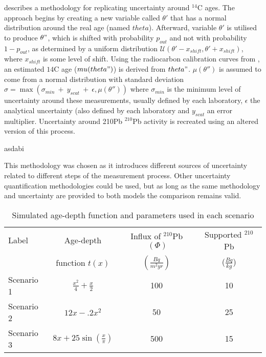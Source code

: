 \documentclass [10pt] {article}
\begin{document}
\citet{Blaauw2018} describes a methodology for replicating uncertainty around $^{14}$C ages. 
The approach begins by creating a new variable called $\theta'$ that has a normal distribution around the real age (named $theta$).
Afterward, variable $\theta'$ is utilised to produce $\theta"$, which is shifted with probability $p_{out}$ and not with probability $1-p_{out}$, as determined by a uniform distribution $\mathcal{U}(\theta' - x_{shift},\theta'+x_{shift})$, where $x_{shift}$ is some level of shift.
Using the radiocarbon calibration curves from \citep{Reimer2013}, an estimated $14$C age ($mu(theta")$) is derived from $theta"$.
$\mu(\theta'')$ is assumed to come from a normal distribution with standard deviation $\sigma =\max( \sigma_{min}~+~y_{scat}~+~\epsilon,\mu(\theta'') )$ where $\sigma_{min}$ is the minimum level of uncertainty around these measurements, usually defined by each laboratory, $\epsilon$ the analytical uncertainty (also defined by each laboratory and $y_{scat}$ an error multiplier. 
Uncertainty around 210Pb $^{210}$Pb  activity is recreated using an altered version of this process.

asdabi

This methodology was chosen as it introduces different sources of uncertainty related to different steps of the measurement process.
Other uncertainty quantification methodologies could be used, but as long as the same methodology and uncertainty are provided to both models the comparison remains valid.

\begin{table}[!h]
	\centering
	\begin{tabular}{l|ccc}
	     Label   & 	Age-depth			&	Influx of $^{210}$Pb$~(\Phi)$	& Supported $^{210}$Pb  \\
			&	function $t(x)$		&	$(\frac{Bq}{m^2yr})$	& ($\frac{Bq}{kg}$) 	\\ \hline
Scenario 1 	&	$\frac{x^2}{4} + \frac{x}{2}$	&	100	& 10	\\
Scenario 2 	&	$12x -.2x^2$			&	50	& 25	\\
Scenario 3 	&	$8x+25\sin(\frac{x}{\pi})$	&	500 	& 15		
	\end{tabular}
	\label{tab:sim_param}
	\caption{Simulated age-depth function and parameters used in each scenario}
\end{table}
\end{document}
